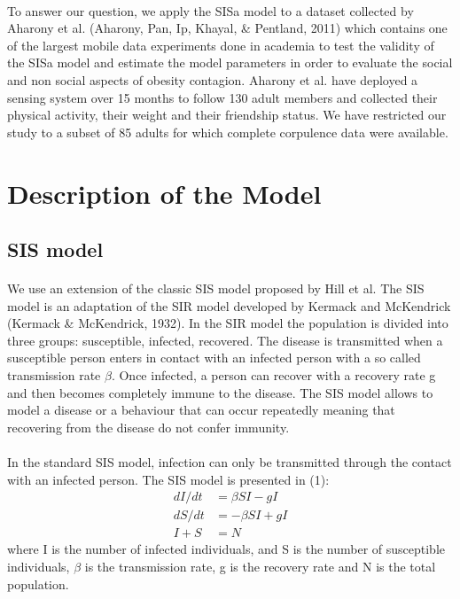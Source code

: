 \documentclass[11pt]{article}
\begin{document}
\paragraph{}
To answer our question, we apply the SISa model to a dataset collected by Aharony et al. (Aharony, Pan, Ip, Khayal, \& Pentland, 2011) which contains one of the largest mobile data experiments done in academia to test the validity of the SISa model and estimate the model parameters in order to evaluate the social and non social aspects of obesity contagion. Aharony et al. have deployed a sensing system over 15 months to follow 130 adult members and collected their physical activity, their weight and their friendship status. We have restricted our study to a subset of 85 adults for which complete corpulence data were available.


\section{Description of the Model}

\subsection{SIS model}
\paragraph{}
We use an extension of the classic SIS model proposed by Hill et al. The SIS model is an adaptation of the SIR model developed by Kermack and McKendrick (Kermack \& McKendrick, 1932). In the SIR model the population is divided into three groups: susceptible, infected, recovered. The disease is transmitted when a susceptible person enters in contact with an infected person with a so called transmission rate $\beta$. Once infected, a person can recover with a recovery rate g and then becomes completely immune to the disease. The SIS model allows to model a disease or a behaviour that can occur repeatedly meaning that recovering from the disease do not confer immunity.

\paragraph{}

In the standard SIS model, infection can only be transmitted through the contact with an infected person. The SIS model is presented in (1):
\begin{align}
      dI/dt  & =  \beta SI-gI \nonumber\\
      dS/dt   & =  -\beta SI+gI \\ 
      I+S & =  N \nonumber
\end{align}
where I is the number of infected individuals, and S is the number of susceptible individuals, $\beta$ is the transmission rate, g is the recovery rate and N is the total population. 
\end{document}
